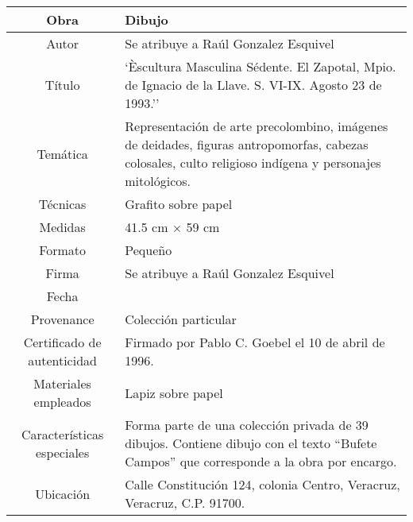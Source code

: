 \documentclass[10pt,letter]{report}
\begin{document}
\begin{table}[H]
\centering
\begin{tabular}{|c|m{}|}
\hline
Obra& Dibujo	\\
\hline
Autor & Se atribuye a Ra\'ul Gonzalez Esquivel\\
\hline
T\'itulo & `Èscultura Masculina S\'edente. El Zapotal, Mpio. de Ignacio de la Llave. S. VI-IX. Agosto 23 de 1993.'' \\
\hline
Tem\'atica & Representaci\'on de arte precolombino, im\'agenes de deidades, figuras antropomorfas, cabezas colosales, culto religioso ind\'igena y personajes mitol\'ogicos.\\
\hline
T\'ecnicas &Grafito sobre papel \\
\hline
Medidas & 41.5 cm $\times$ 59 cm \\
\hline
 Formato & Peque\~no \\
 \hline
 Firma &  Se atribuye a Ra\'ul Gonzalez Esquivel\\
 \hline
  Fecha & \\
 \hline
 Provenance & Colecci\'on particular\\
 \hline
 Certificado de autenticidad& Firmado por Pablo C. Goebel el 10 de abril de 1996.  \\
 \hline 
  Materiales empleados & Lapiz sobre papel\\
 \hline
 Caracter\'isticas especiales & Forma parte de una colecci\'on privada de 39 dibujos. 
Contiene dibujo con el texto ``Bufete Campos'' que corresponde a la obra por encargo. \\
\hline 
Ubicaci\'on & Calle Constituci\'on 124, colonia Centro, Veracruz, Veracruz, C.P. 91700.\\
\hline

\end{tabular}
\end{table}
\end{document}
